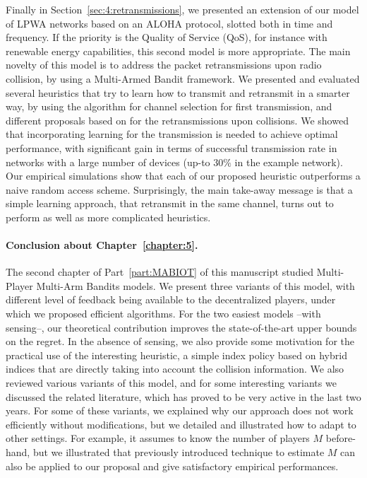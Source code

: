 Finally in Section~\ref{sec:4:retransmissions}, we presented an extension of our model of LPWA networks based on an ALOHA protocol, slotted both in time and frequency.
If the priority is the Quality of Service (QoS), for instance with renewable energy capabilities, this second model is more appropriate.
The main novelty of this model is to address the packet retransmissions upon radio collision, by using a Multi-Armed Bandit framework.
We presented and evaluated several heuristics that try to learn how to transmit and retransmit in a smarter way, by using the \UCB{} algorithm for channel selection for first transmission, and different proposals based on \UCB{} for the retransmissions upon collisions.
%
We showed that incorporating learning for the transmission is needed to achieve optimal performance, with significant gain in terms of successful transmission rate in networks with a large number of devices (up-to $30\%$ in the example network).
Our empirical simulations show that each of our proposed heuristic outperforms a naive random access scheme.
Surprisingly, the main take-away message is that a simple \UCB{} learning approach, that retransmit in the same channel, turns out to perform as well as more complicated heuristics.


\paragraph{Conclusion about \textbf{Chapter~\ref{chapter:5}}.}

The second chapter of Part~\ref{part:MABIOT} of this manuscript studied Multi-Player Multi-Arm Bandits models.
%
We present three variants of this model,
with different level of feedback being available to the decentralized players, under which we proposed efficient algorithms.
For the two easiest models --with sensing--, our theoretical contribution improves the state-of-the-art upper bounds on the regret. In the absence of sensing, we also provide some motivation for the practical use of the interesting \Selfish{} heuristic, a simple index policy based on hybrid indices that are directly taking  into account the collision information.
%
We also reviewed various variants of this model, and for some interesting variants we discussed the related literature, which has proved to be very active in the last two years.
For some of these variants, we explained why our approach does not work efficiently without modifications, but we detailed and illustrated how to adapt \MCTopM{} to other settings.
For example, it assumes to know the number of players $M$ before-hand, but we illustrated that previously introduced technique to estimate $M$ can also be applied to our proposal and give satisfactory empirical performances.


